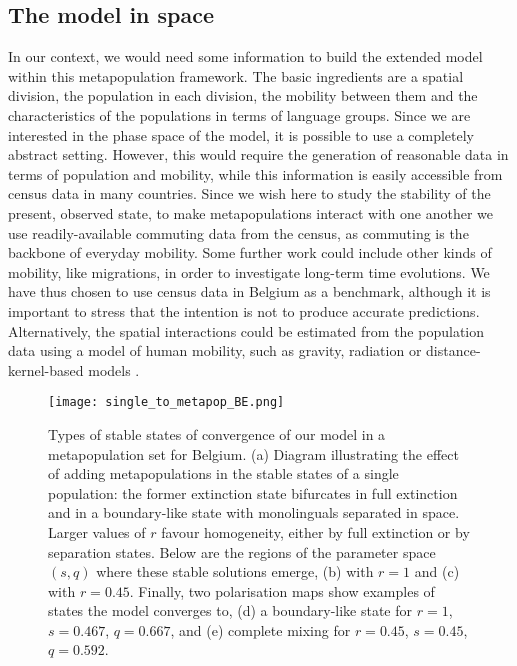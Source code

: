 \documentclass[../thesis.tex]{subfiles}
\begin{document}
\subsection{The model in space}

In our context, we would need some information to build the extended model within this
metapopulation framework. The basic ingredients are a spatial division, the population
in each division, the mobility between them and the characteristics of the populations
in terms of language groups. Since we are interested in the phase space of the model, it
is possible to use a completely abstract setting. However, this would require the
generation of reasonable data in terms of population and mobility, while this
information is easily accessible from census data in many countries. Since we wish here
to study the stability of the present, observed state, to make metapopulations interact
with one another we use readily-available commuting data from the census, as commuting
is the backbone of everyday mobility. Some further work could include other kinds of
mobility, like migrations, in order to investigate long-term time evolutions. We have
thus chosen to use census data in Belgium as a benchmark, although it is important to
stress that the intention is not to produce accurate predictions. Alternatively, the
spatial interactions could be estimated from the population data using a model of human
mobility, such as gravity, radiation or distance-kernel-based models
\cite{BarbosaHumanMobility2018,BurridgeSpatialEvolution2017,BurridgeInferringDrivers2021}.

\begin{figure}[hp!]
  \centering
  \texttt{[image: single\_to\_metapop\_BE.png]}
  \caption{Types of stable states of convergence of our model in a metapopulation set
  for Belgium. (a) Diagram illustrating the effect of adding metapopulations in the
  stable states of a single population: the former extinction state bifurcates in full
  extinction and in a boundary-like state with monolinguals separated in space. Larger
  values of $r$ favour homogeneity, either by full extinction or by separation states.
  Below are the regions of the parameter space $(s,q)$ where these stable solutions
  emerge, (b) with $r=1$ and (c) with $r=0.45$. Finally, two polarisation maps show
  examples of states the model converges to, (d) a boundary-like state for $r=1$,
  $s=0.467$, $q=0.667$, and (e) complete mixing for $r=0.45$, $s=0.45$, $q=0.592$.}
  \label{fig:single_to_metapop_BE}
\end{figure}
\end{document}
